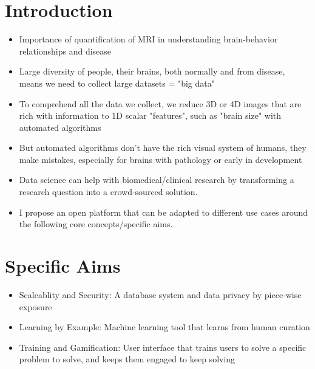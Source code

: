 \section{Introduction}
\begin{itemize}
\item Importance of quantification of MRI in understanding brain-behavior relationships and disease
\item Large diversity of people, their brains, both normally and from disease, means we need to collect large datasets = "big data"
\item To comprehend all the data we collect, we reduce 3D or 4D images that are rich with information to 1D scalar "features", such as "brain size" with automated algorithms
\item But automated algorithms don't have the rich visual system of humans, they make mistakes, especially for brains with pathology or early in development
\item Data science can help with biomedical/clinical research by transforming a research question into a crowd-sourced solution. 
\item I propose an open platform that can be adapted to different use cases around the following core concepts/specific aims.
\end{itemize}

\section{Specific Aims}
\begin{itemize}
\item Scaleablity and Security: A database system and data privacy by piece-wise exposure
\item Learning by Example: Machine learning tool that learns from human curation
\item Training and Gamification: User interface that trains users to solve a specific problem to solve, and keeps them engaged to keep solving
\end{itemize}